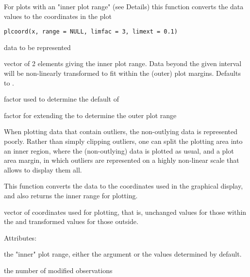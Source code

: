 \documentclass{article}
\begin{document}
\begin{Description}\relax
For plots with an "inner plot range" (see Details) this function
converts the data values to the coordinates in the plot
\end{Description}
\begin{Usage}
\begin{verbatim}
plcoord(x, range = NULL, limfac = 3, limext = 0.1)
\end{verbatim}
\end{Usage}
\begin{Arguments}
\begin{ldescription}
\item[\code{x}] data to be represented 
\item[\code{range}] vector of 2 elements giving the inner plot range. Data
beyond the given interval will be non-linearly transformed to fit
within the (outer) plot margins. Defaults to
.

\item[\code{limfac}] factor used to determine the default of  
\item[\code{limext}] factor for extending the  to determine the
outer plot range 
\end{ldescription}
\end{Arguments}
\begin{Details}\relax
When plotting data that contain outliers, the non-outlying data is
represented poorly. Rather than simply clipping outliers, one can
split the plotting area into an inner region, where the (non-outlying)
data is plotted as usual, and a plot area margin, in which outliers
are represented on a highly non-linear scale that allows to display
them all.

This function converts the data to the coordinates used in the
graphical display, and also returns the inner range for plotting.
\end{Details}
\begin{Value}
vector of coordinates used for plotting, that is, unchanged 
values for   those within the  and transformed values
for those outside.

Attributes:
\begin{ldescription}
\item[\code{attr(,"range")}] the "inner" plot range, either the argument
 or the values determined by default.
\item[\code{attr(,"nmod")}] the number of modified observations
\end{ldescription}
\end{Value}
\end{document}
